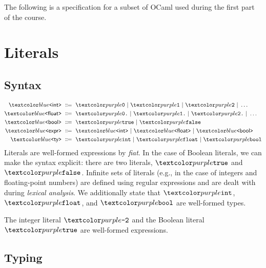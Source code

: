 
The following is a specification for a subset of OCaml used during the
first part of the course.

\section{Literals}

\subsection*{Syntax}

\begin{align*}
  \bnfnt{int} &\bnfeq \bnft 0 \bnfalt \bnft 1 \bnfalt \bnft 2 \bnfalt \dots \\
  \bnfnt{float} &\bnfeq \bnft {0.} \bnfalt \bnft {1.} \bnfalt \bnft {2.} \bnfalt \dots \\
  \bnfnt{bool} &\bnfeq \bnft {true} \bnfalt \bnft {false} \\
  \bnfnt{expr} &\bnfeq \bnfnt{int} \bnfalt \bnfnt{float} \bnfalt \bnfnt{bool} \\
  \bnfnt{ty} &\bnfeq \bnft{int} \bnfalt \bnft{float} \bnfalt \bnft{bool}
\end{align*}
Literals are well-formed expressions by \textit{fiat}.  In the case of
Boolean literals, we can make the syntax explicit: there are two
literals, $\bnft{true}$ and $\bnft{false}$.  Infinite sets of literals
(e.g., in the case of integers and floating-point numbers) are defined
using regular expressions and are dealt with during \textit{lexical
  analysis}.  We additionally state that $\codel{int}$,
$\codel{float}$, and $\codel{bool}$ are well-formed types.

\begin{example}
  The integer literal $\codel{-2}$ and the Boolean literal
  $\codel{true}$ are well-formed expressions.
\end{example}

\subsection*{Typing}

